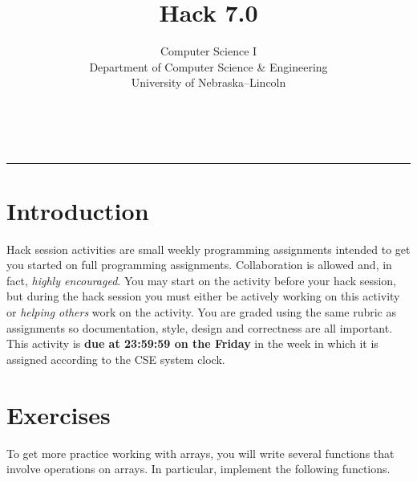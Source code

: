 \documentclass[12pt]{scrartcl}
\title{Hack 7.0}\let\Title\@title
\subtitle{Computer Science I\\
{\small
\vskip1cm
Department of Computer Science \& Engineering \\
University of Nebraska--Lincoln}
\vskip-1cm}
\date{~}
\begin{document}
\maketitle

\hrule

\section*{Introduction}

Hack session activities are small weekly programming assignments intended
to get you started on full programming assignments.  Collaboration is allowed
and, in fact, \emph{highly encouraged}.  You may start on the activity before
your hack session, but during the hack session you must either be actively 
working on this activity or \emph{helping others} work on the activity.
You are graded using the same rubric as assignments so documentation, style, 
design and correctness are all important.  This activity is \textbf{due 
at 23:59:59 on the Friday} in the week in which it is assigned according 
to the CSE system clock.

\section*{Exercises}

To get more practice working with arrays, you will write several 
functions that involve operations on arrays.  In particular, implement
the following functions.
\end{document}
